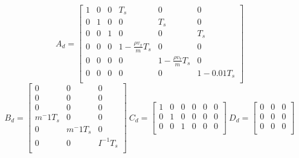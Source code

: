 $$
A_d=
\begin{bmatrix}
1 & 0 & 0 & T_s & 0 & 0 \\
0 & 1 & 0 & 0 & T_s & 0 \\
0 & 0 & 1 & 0 & 0 & T_s \\
0 & 0 & 0 & 1 - \frac{\rho v_x}{m}T_s & 0 & 0 \\
0 & 0 & 0 & 0 & 1 - \frac{\rho v_7}{m}T_s & 0  \\
0 & 0 & 0 & 0 & 0 & 1-0.01T_s \\
\end{bmatrix}
$$
$$
B_d=
\begin{bmatrix}
0 & 0 & 0 \\
0 & 0 & 0 \\
0 & 0 & 0 \\
m^-1T_s & 0 & 0 \\
0 & m^-1T_s & 0 \\
0 & 0 & I^{-1}T_s \\
\end{bmatrix}
\ 
C_d=
\begin{bmatrix}
1 & 0 & 0 & 0 & 0 & 0 \\
0 & 1 & 0 & 0 & 0 & 0 \\
0 & 0 & 1 & 0 & 0 & 0 \\
\end{bmatrix}\ 
D_d=
\begin{bmatrix}
0 & 0 & 0 \\
0 & 0 & 0 \\
0 & 0 & 0 \\
\end{bmatrix}
$$

